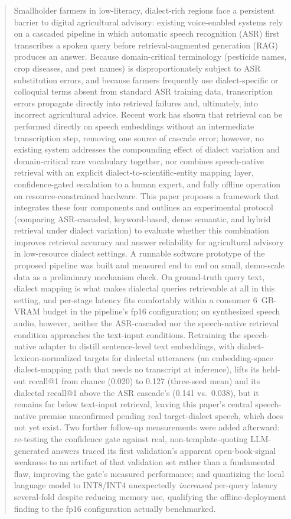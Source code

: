 \documentclass[conference]{IEEEtran}
\begin{document}
\begin{abstract}
Smallholder farmers in low-literacy, dialect-rich regions face a persistent barrier to digital agricultural advisory: existing voice-enabled systems rely on a cascaded pipeline in which automatic speech recognition (ASR) first transcribes a spoken query before retrieval-augmented generation (RAG) produces an answer. Because domain-critical terminology (pesticide names, crop diseases, and pest names) is disproportionately subject to ASR substitution errors, and because farmers frequently use dialect-specific or colloquial terms absent from standard ASR training data, transcription errors propagate directly into retrieval failures and, ultimately, into incorrect agricultural advice. Recent work has shown that retrieval can be performed directly on speech embeddings without an intermediate transcription step, removing one source of cascade error; however, no existing system addresses the compounding effect of dialect variation and domain-critical rare vocabulary together, nor combines speech-native retrieval with an explicit dialect-to-scientific-entity mapping layer, confidence-gated escalation to a human expert, and fully offline operation on resource-constrained hardware. This paper proposes a framework that integrates these four components and outlines an experimental protocol (comparing ASR-cascaded, keyword-based, dense semantic, and hybrid retrieval under dialect variation) to evaluate whether this combination improves retrieval accuracy and answer reliability for agricultural advisory in low-resource dialect settings. A runnable software prototype of the proposed pipeline was built and measured end to end on small, demo-scale data as a preliminary mechanism check. On ground-truth query text, dialect mapping is what makes dialectal queries retrievable at all in this setting, and per-stage latency fits comfortably within a consumer 6~GB-VRAM budget in the pipeline's fp16 configuration; on synthesized speech audio, however, neither the ASR-cascaded nor the speech-native retrieval condition approaches the text-input conditions. Retraining the speech-native adapter to distill sentence-level text embeddings, with dialect-lexicon-normalized targets for dialectal utterances (an embedding-space dialect-mapping path that needs no transcript at inference), lifts its held-out recall@1 from chance (0.020) to 0.127 (three-seed mean) and its dialectal recall@1 above the ASR cascade's (0.141 vs.\ 0.038), but it remains far below text-input retrieval, leaving this paper's central speech-native premise unconfirmed pending real target-dialect speech, which does not yet exist. Two further follow-up measurements were added afterward: re-testing the confidence gate against real, non-template-quoting LLM-generated answers traced its first validation's apparent open-book-signal weakness to an artifact of that validation set rather than a fundamental flaw, improving the gate's measured performance; and quantizing the local language model to INT8/INT4 unexpectedly \emph{increased} per-query latency several-fold despite reducing memory use, qualifying the offline-deployment finding to the fp16 configuration actually benchmarked.
\end{abstract}
\end{document}
